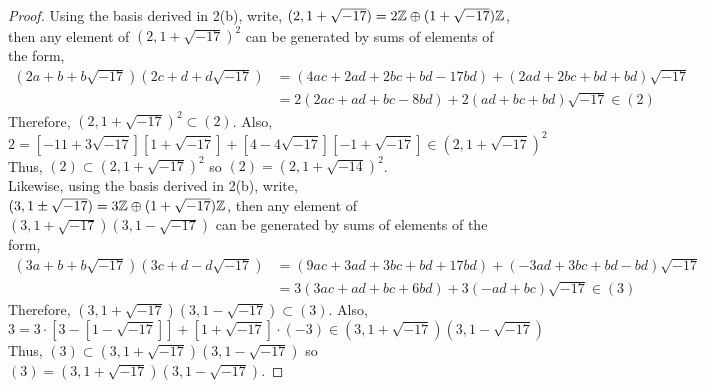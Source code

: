 \documentclass[12pt]{extarticle}
\begin{document}
\begin{proof}
Using the basis derived in 2(b), write, $(2, 1 + \sqrt{-17}) = 2 \mathbb{Z} \oplus (1 + \sqrt{-17})\mathbb{Z}$, then any element of $(2, 1 + \sqrt{-17})^2$ can be generated by sums of elements of the form,
\begin{align*}
(2 a + b + b \sqrt{-17})(2c + d + d\sqrt{-17}) & = (4 ac + 2 a d + 2 b c + bd - 17 bd) + (2 a d + 2 b c + bd + bd) \sqrt{-17} \\ & = 2(2 ac + ad + bc - 8 bd) + 2 (ad + bc + bd)  \sqrt{-17} \in (2)
\end{align*}
Therefore, $(2, 1 + \sqrt{-17})^2 \subset (2)$. Also,
\[2 = [-11 + 3 \sqrt{-17}][1 + \sqrt{-17}] + [4 - 4 \sqrt{-17}][-1 + \sqrt{-17}] \in (2, 1 + \sqrt{-17})^2\]
Thus, $(2) \subset (2, 1 + \sqrt{-17})^2$ so $(2) = (2, 1 + \sqrt{-14})^2$.  \bigskip \\
Likewise, using the basis derived in 2(b), write, $(3, 1 \pm \sqrt{-17}) = 3 \mathbb{Z} \oplus (1 + \sqrt{-17})\mathbb{Z}$, then any element of $(3, 1 + \sqrt{-17})(3, 1 - \sqrt{-17})$ can be generated by sums of elements of the form,
\begin{align*}
(3 a + b + b \sqrt{-17})(3c + d - d\sqrt{-17}) & = (9 ac + 3 a d + 3 b c + bd + 17 bd) + (-3 a d + 3 b c + bd - bd) \sqrt{-17} \\ & = 3(3 ac + ad + bc + 6 bd) + 3 (-ad + bc) \sqrt{-17} \in (3)
\end{align*}
Therefore, $(3, 1 + \sqrt{-17})(3, 1 - \sqrt{-17}) \subset (3)$. Also,
\[3 = 3 \cdot [3 - [1  - \sqrt{-17}]] + [1 + \sqrt{-17}] \cdot (-3) \in (3, 1 + \sqrt{-17}) (3, 1 - \sqrt{-17})\]
Thus, $(3) \subset (3, 1 + \sqrt{-17}) (3, 1 - \sqrt{-17})$ so $(3) = (3, 1 + \sqrt{-17}) (3, 1 - \sqrt{-17})$. 
\end{proof}
\end{document}
